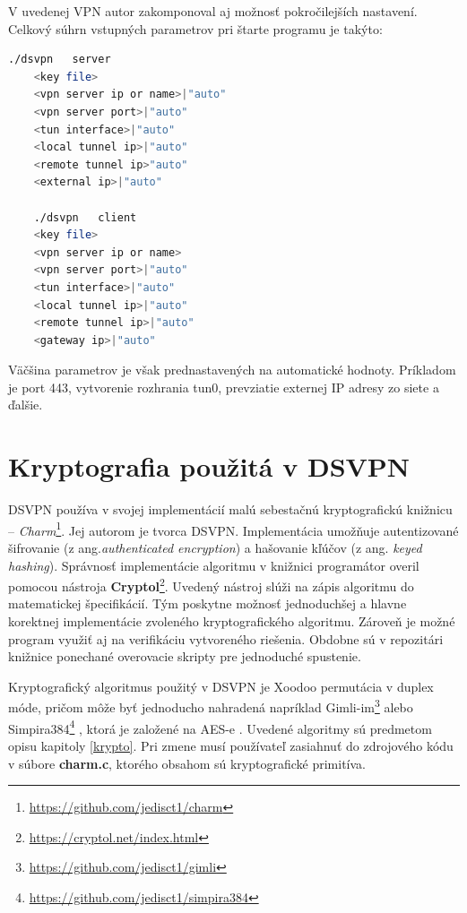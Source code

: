 V uvedenej VPN autor zakomponoval aj možnosť pokročilejších nastavení. Celkový súhrn vstupných parametrov pri štarte programu je takýto:
\begin{lstlisting}[language=bash]
	./dsvpn   server
	<key file>
	<vpn server ip or name>|"auto"
	<vpn server port>|"auto"
	<tun interface>|"auto"
	<local tunnel ip>|"auto"
	<remote tunnel ip>"auto"
	<external ip>|"auto"

	./dsvpn   client
	<key file>
	<vpn server ip or name>
	<vpn server port>|"auto"
	<tun interface>|"auto"
	<local tunnel ip>|"auto"
	<remote tunnel ip>|"auto"
	<gateway ip>|"auto"
	\end{lstlisting} 
Väčšina parametrov je však prednastavených na automatické hodnoty. Príkladom je port 443, vytvorenie rozhrania tun0, prevziatie externej IP adresy zo siete a ďalšie. 

\section{Kryptografia použitá v DSVPN}
DSVPN používa v svojej implementácií malú sebestačnú kryptografickú knižnicu -- \textit{Charm}\footnote{\url{https://github.com/jedisct1/charm}}. Jej autorom je tvorca DSVPN. Implementácia umožňuje autentizované šifrovanie (z ang.\textit{authenticated encryption}) a hašovanie kľúčov (z ang. \textit{keyed hashing}). Správnosť implementácie algoritmu v knižnici programátor overil pomocou nástroja \textbf{Cryptol}\footnote{\url{https://cryptol.net/index.html}}. Uvedený nástroj slúži na zápis algoritmu do matematickej špecifikácií. Tým poskytne možnosť jednoduchšej a hlavne korektnej implementácie zvoleného kryptografického algoritmu. Zároveň je možné program využiť aj na verifikáciu vytvoreného riešenia. Obdobne sú v repozitári knižnice ponechané overovacie skripty pre jednoduché spustenie. 

Kryptografický algoritmus použitý v DSVPN je Xoodoo permutácia v duplex móde, pričom môže byť jednoducho nahradená napríklad Gimli-im\footnote{\url{https://github.com/jedisct1/gimli}} \cite{gimli} alebo Simpira384\footnote{\url{https://github.com/jedisct1/simpira384}} \cite{simpira}, ktorá je založené na AES-e . Uvedené algoritmy sú predmetom opisu kapitoly \ref{krypto}. Pri zmene musí používateľ zasiahnuť do zdrojového kódu v súbore \textbf{charm.c}, ktorého obsahom sú kryptografické primitíva.     
